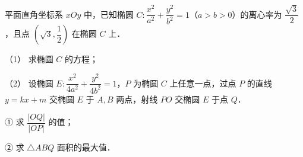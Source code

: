 \begin{question}
平面直角坐标系 \(xOy\) 中，已知椭圆 \(C:\dfrac{x^2}{a^2}+\dfrac{y^2}{b^2}=1\)（\(a>b>0\)）的离心率为 \(\dfrac{\sqrt3}{2}\)，且点 \(\left(\sqrt3,\dfrac12\right)\) 在椭圆 \(C\) 上．

（1） 求椭圆 \(C\) 的方程；

（2） 设椭圆 \(E:\dfrac{x^2}{4a^2}+\dfrac{y^2}{4b^2}=1\)，\(P\) 为椭圆 \(C\) 上任意一点，过点 \(P\) 的直线 \(y=kx+m\) 交椭圆 \(E\) 于 \(A,B\) 两点，射线 \(PO\) 交椭圆 \(E\) 于点 \(Q\)．

① 求 \(\dfrac{|OQ|}{|OP|}\) 的值；

② 求 \(\triangle ABQ\) 面积的最大值．

\end{question}